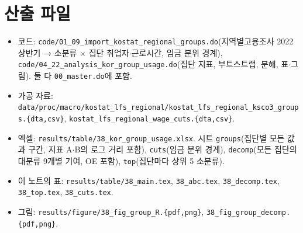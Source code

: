 \documentclass[11pt]{article}
\begin{document}
\section{산출 파일}

\begin{itemize}[leftmargin=*]
  \item 코드: \texttt{code/01\_09\_import\_kostat\_regional\_groups.do}(지역별고용조사 2022 상반기 → 소분류 $\times$ 집단 취업자$\cdot$근로시간, 임금 분위 경계), \texttt{code/04\_22\_analysis\_kor\_group\_usage.do}(집단 지표, 부트스트랩, 분해, 표$\cdot$그림). 둘 다 \texttt{00\_master.do}에 포함.
  \item 가공 자료: \texttt{data/proc/macro/kostat\_lfs\_regional/kostat\_lfs\_regional\_ksco3\_groups.\{dta,csv\}}, \texttt{kostat\_lfs\_regional\_wage\_cuts.\{dta,csv\}}.
  \item 엑셀: \texttt{results/table/38\_kor\_group\_usage.xlsx}. 시트 \texttt{groups}(집단별 모든 값과 구간, 지표 A$\cdot$B의 로그 거리 포함), \texttt{cuts}(임금 분위 경계), \texttt{decomp}(모든 집단의 대분류 9개별 기여, OE 포함), \texttt{top}(집단마다 상위 5 소분류).
  \item 이 노트의 표: \texttt{results/table/38\_main.tex}, \texttt{38\_abc.tex}, \texttt{38\_decomp.tex}, \texttt{38\_top.tex}, \texttt{38\_cuts.tex}.
  \item 그림: \texttt{results/figure/38\_fig\_group\_R.\{pdf,png\}}, \texttt{38\_fig\_group\_decomp.\{pdf,png\}}.
\end{itemize}

\printbibliography[title={참고문헌}]
\end{document}
